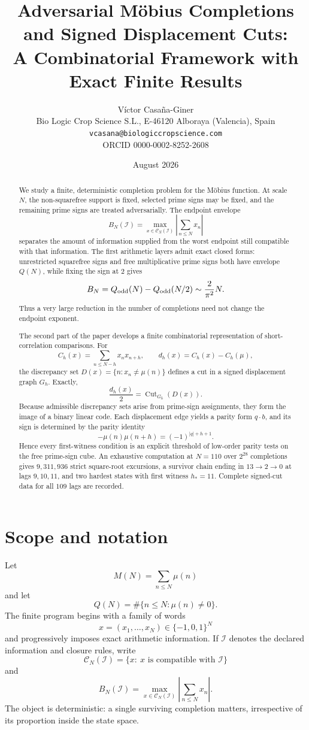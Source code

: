\documentclass[11pt]{article}
\title{Adversarial M\"obius Completions and Signed Displacement Cuts:\\
A Combinatorial Framework with Exact Finite Results}
\author{V\'ictor Casa\~na-Giner\\
Bio Logic Crop Science S.L., E-46120 Alboraya (Valencia), Spain\\
\texttt{vcasana@biologiccropscience.com}\\
ORCID 0000-0002-8252-2608}
\date{August 2026}
\newcommand{\Cut}{\operatorname{Cut}}
\begin{document}
\maketitle

\begin{abstract}
We study a finite, deterministic completion problem for the M\"obius function.  At scale $N$, the non-squarefree support is fixed, selected prime signs may be fixed, and the remaining prime signs are treated adversarially.  The endpoint envelope
\[
 B_N(\mathcal I)=\max_{x\in\mathcal C_N(\mathcal I)}
 \left|\sum_{n\le N}x_n\right|
\]
separates the amount of information supplied from the worst endpoint still compatible with that information.  The first arithmetic layers admit exact closed forms: unrestricted squarefree signs and free multiplicative prime signs both have envelope $Q(N)$, while fixing the sign at $2$ gives
\[
 B_N=Q_{\rm odd}(N)-Q_{\rm odd}(N/2)\sim \frac{2}{\pi^2}N.
\]
Thus a very large reduction in the number of completions need not change the endpoint exponent.

The second part of the paper develops a finite combinatorial representation of short-correlation comparisons.  For
\[
 C_h(x)=\sum_{n\le N-h}x_nx_{n+h},\qquad
 d_h(x)=C_h(x)-C_h(\mu),
\]
the discrepancy set $D(x)=\{n:x_n\ne\mu(n)\}$ defines a cut in a signed displacement graph $G_h$.  Exactly,
\[
 \frac{d_h(x)}2=\Cut_{G_h}(D(x)).
\]
Because admissible discrepancy sets arise from prime-sign assignments, they form the image of a binary linear code.  Each displacement edge yields a parity form $q\cdot b$, and its sign is determined by the parity identity
\[
 -\mu(n)\mu(n+h)=(-1)^{|q|+h+1}.
\]
Hence every first-witness condition is an explicit threshold of low-order parity tests on the free prime-sign cube.  An exhaustive computation at $N=110$ over $2^{28}$ completions gives $9{,}311{,}936$ strict square-root excursions, a survivor chain ending in $13\to2\to0$ at lags $9,10,11$, and two hardest states with first witness $h_*=11$.  Complete signed-cut data for all $109$ lags are recorded.
\end{abstract}

\section{Scope and notation}

Let
\[
 M(N)=\sum_{n\le N}\mu(n)
\]
and let
\[
 Q(N)=\#\{n\le N:\mu(n)\ne0\}.
\]
The finite program begins with a family of words
\[
 x=(x_1,\ldots,x_N)\in\{-1,0,1\}^N
\]
and progressively imposes exact arithmetic information.  If $\mathcal I$ denotes the declared information and closure rules, write
\[
 \mathcal C_N(\mathcal I)
 =\{x:\ x\text{ is compatible with }\mathcal I\}
\]
and
\[
 \boxed{
 B_N(\mathcal I)=
 \max_{x\in\mathcal C_N(\mathcal I)}
 \left|\sum_{n\le N}x_n\right|.
 }
\]
The object is deterministic: a single surviving completion matters, irrespective of its proportion inside the state space.
\end{document}
